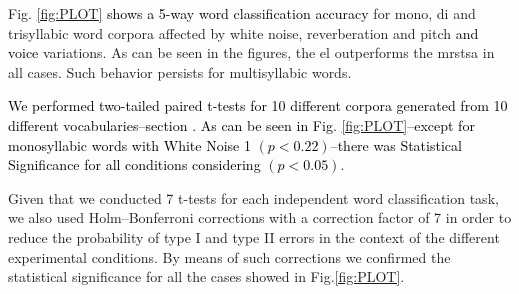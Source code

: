 \documentclass[10pt,letterpaper]{article}
\newcommand{\newreview}[1]{\textcolor{airforceblue}{#1}}
\newcommand{\reviewertwo}[1]{\textcolor{black}{#1}}
\newcommand{\reviewerfour}[1]{\textcolor{black}{#1}}
\begin{document}

Fig. \ref{fig:PLOT}
\reviewertwo{shows a 5-way word classification accuracy} for mono, di and trisyllabic word corpora affected by
white noise, reverberation and pitch \reviewerfour{and voice} variations.
As can be seen in the figures, the \gls{el} outperforms the \gls{mrstsa} in all cases.
Such behavior persists for multisyllabic words.

\reviewertwo{We performed \newreview{two-tailed} paired t-tests for 10 different corpora generated from 10 different vocabularies--section \nameref{CorpGen}. As can be seen in Fig. \ref{fig:PLOT}--except for monosyllabic words with White Noise 1 \newreview{$(p < 0.22)$}--there was Statistical Significance for all conditions considering $(p<0.05)$}.

\newreview{Given that we conducted 7 t-tests for each independent word classification task, we also used Holm–Bonferroni corrections with a correction factor of 7 in order to reduce the probability of type I and type II errors in the context of the different experimental conditions. By means of such corrections we confirmed the statistical significance for all the cases showed in Fig.\ref{fig:PLOT}.}
\end{document}
